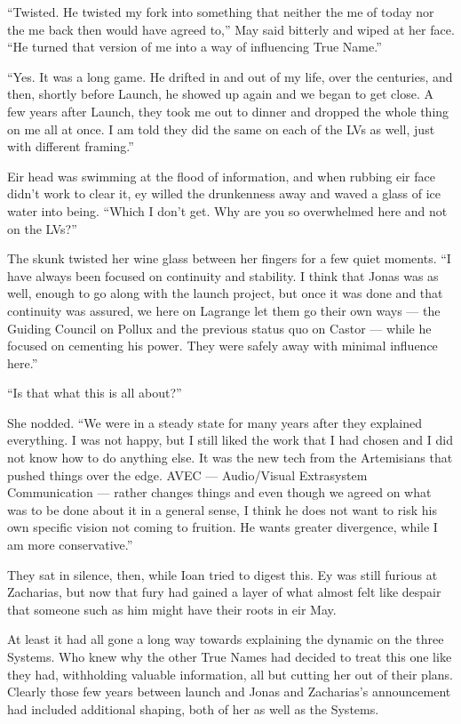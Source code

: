 ``Twisted. He twisted my fork into something that neither the me of today nor the me back then would have agreed to,'' May said bitterly and wiped at her face. ``He turned that version of me into a way of influencing True Name.''

``Yes. It was a long game. He drifted in and out of my life, over the centuries, and then, shortly before Launch, he showed up again and we began to get close. A few years after Launch, they took me out to dinner and dropped the whole thing on me all at once. I am told they did the same on each of the LVs as well, just with different framing.''

Eir head was swimming at the flood of information, and when rubbing eir face didn't work to clear it, ey willed the drunkenness away and waved a glass of ice water into being. ``Which I don't get. Why are you so overwhelmed here and not on the LVs?''

The skunk twisted her wine glass between her fingers for a few quiet moments. ``I have always been focused on continuity and stability. I think that Jonas was as well, enough to go along with the launch project, but once it was done and that continuity was assured, we here on Lagrange let them go their own ways — the Guiding Council on Pollux and the previous status quo on Castor — while he focused on cementing his power. They were safely away with minimal influence here.''

``Is that what this is all about?''

She nodded. ``We were in a steady state for many years after they explained everything. I was not happy, but I still liked the work that I had chosen and I did not know how to do anything else. It was the new tech from the Artemisians that pushed things over the edge. AVEC — Audio/Visual Extrasystem Communication — rather changes things and even though we agreed on what was to be done about it in a general sense, I think he does not want to risk his own specific vision not coming to fruition. He wants greater divergence, while I am more conservative.''

They sat in silence, then, while Ioan tried to digest this. Ey was still furious at Zacharias, but now that fury had gained a layer of what almost felt like despair that someone such as him might have their roots in eir May.

At least it had all gone a long way towards explaining the dynamic on the three Systems. Who knew why the other True Names had decided to treat this one like they had, withholding valuable information, all but cutting her out of their plans. Clearly those few years between launch and Jonas and Zacharias's announcement had included additional shaping, both of her as well as the Systems.

